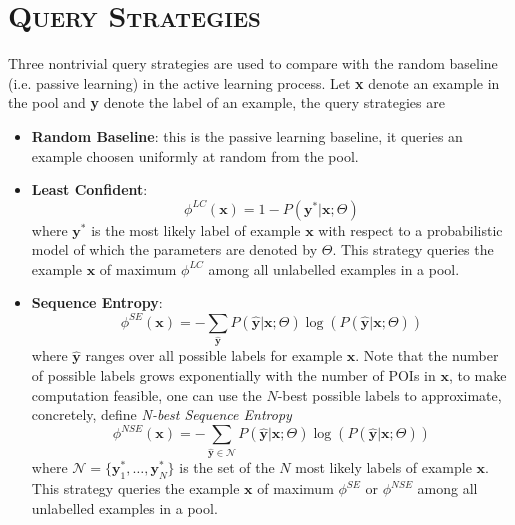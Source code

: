 \documentclass[11pt, a4paper]{article}
\begin{document}
\section{\textsc{Query Strategies}}
Three nontrivial query strategies are used to compare with the random baseline (i.e. passive learning) in the active learning process.
Let \textbf{x} denote an example in the pool and \textbf{y} denote the label of an example,
the query strategies are
\begin{itemize}
\item \textbf{Random Baseline}: this is the passive learning baseline,
      it queries an example choosen uniformly at random from the pool.
\item \textbf{Least Confident}\cite{settles08}: 
      \begin{equation*}
      \phi^{LC}(\textbf{x}) = 1 - P(\textbf{y}^* \vert \textbf{x}; \Theta)
      \end{equation*}
      where $\textbf{y}^*$ is the most likely label of example $\textbf{x}$ with respect to a probabilistic model 
      of which the parameters are denoted by $\Theta$.  
      This strategy queries the example $\textbf{x}$ of maximum $\phi^{LC}$ among all unlabelled examples in a pool.
\item \textbf{Sequence Entropy}\cite{settles08}:
      \begin{equation*}
      \phi^{SE}(\textbf{x}) = - \sum_{\hat{\textbf{y}}} P(\hat{\textbf{y}} \vert \textbf{x}; \Theta) 
                                \log(P(\hat{\textbf{y}} \vert \textbf{x}; \Theta))
      \end{equation*}
      where $\hat{\textbf{y}}$ ranges over all possible labels for example $\textbf{x}$.  
      Note that the number of possible labels grows exponentially with the number of POIs in $\textbf{x}$, 
      to make computation feasible, one can use the $N$-best possible labels to approximate,
      concretely, define \textit{N-best Sequence Entropy}\cite{kim06}
      \begin{equation*}
      \phi^{NSE}(\textbf{x}) = - \sum_{\hat{\textbf{y}} \in \mathcal{N}} P(\hat{\textbf{y}} \vert \textbf{x}; \Theta) 
                                 \log(P(\hat{\textbf{y}} \vert \textbf{x}; \Theta))
      \end{equation*}
      where $\mathcal{N} = \{\textbf{y}_1^*, \dots, \textbf{y}_N^*\}$ is the set of the $N$ most likely labels of example $\textbf{x}$.  
      This strategy queries the example $\textbf{x}$ of maximum $\phi^{SE}$ or $\phi^{NSE}$ among all unlabelled examples in a pool.

\end{itemize}
\end{document}
